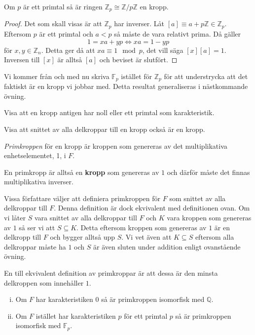 \documentclass{article}
\theoremstyle{definition}
\begin{document}
\hypertarget{zpkropp}{}
\begin{mytheo}{}{}
  Om $p$ är ett primtal så är ringen $\mathbb{Z}_p \cong \mathbb{Z}/p\mathbb{Z}$ en kropp.
\end{mytheo}

\begin{proof}
  Det som skall visas är att $\mathbb{Z}_p$ har inverser. Låt $[a] \equiv a + p \mathbb{Z} \in \mathbb{Z}_p$. Eftersom $p$ är ett primtal och 
  $a < p$ så måste de vara relativt prima. Då gäller 
  \[ 1 = xa + yp  \iff xa = 1 - yp\]
  för $x, y \in \mathbb{Z}_n$. Detta ger då att $xa \equiv 1 \mod p$, det vill säga $[x][a] = 1$. Inversen till 
  $[x]$ är alltså $[a]$ och beviset är slutfört. 
\end{proof}
Vi kommer från och med nu skriva $\mathbb{F}_p$ istället för $\mathbb{Z}_p$ för att understrycka att det faktiskt är en kropp vi jobbar med.
Detta resultat generaliseras i nästkommande övning. 

\begin{ovning}{3}
  Visa att en kropp antigen har noll eller ett primtal som karakteristik. 
\end{ovning}

\begin{ovning}{4}
  Visa att snittet av alla delkroppar till en kropp också är en kropp. 
\end{ovning}

\begin{mydef}{}{}
  \textit{Primkroppen} för en kropp är kroppen som genereras av det multiplikativa enhetselementet, 1, i $F$.
\end{mydef}
En primkropp är alltså en \textbf{kropp} som genereras av $1$ och därför måste det finnas multiplikativa inverser.

Vissa författare väljer att definiera primkroppen för $F$ som snittet av alla delkroppar till $F$. Denna definition är dock ekvivalent med 
definitionen ovan. Om vi låter $S$ vara snittet av alla delkroppar till $F$ och $K$ vara kroppen som genereras av $1$ så ser vi att $S \subseteq K$. 
Detta eftersom 
kroppen som genereras av $1$ är en delkropp till $F$ och bygger alltså upp $S$. Vi vet även att $K \subseteq S$ eftersom alla delkroppar 
måste ha $1$ och $S$ är även sluten under addition enligt ovanstående övning. 

En till ekvivalent definition av primkroppar är att dessa är 
den minsta delkroppen som innehåller $1.$

\hypertarget{primkropp}{}
\begin{mytheo}{}{}
  \begin{enumerate}[(i)]
    \item Om $F$ har karakteristiken $0$ så är primkroppen isomorfisk med $\mathbb{Q}$. 
    \item Om $F$ istället har karakteristiken $p$ för ett primtal $p$ så 
    är primkroppen isomorfisk med $\mathbb{F}_p.$
  \end{enumerate}
\end{mytheo}
\end{document}
